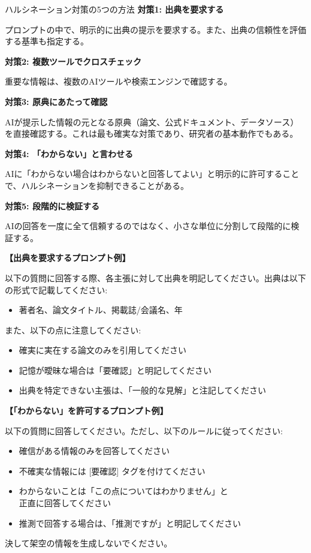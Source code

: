 \begin{itembox}[l]{ハルシネーション対策の5つの方法}
\textbf{対策1: 出典を要求する}

プロンプトの中で、明示的に出典の提示を要求する。また、出典の信頼性を評価する基準も指定する。

\vspace{2mm}
\textbf{対策2: 複数ツールでクロスチェック}

重要な情報は、複数のAIツールや検索エンジンで確認する。

\vspace{2mm}
\textbf{対策3: 原典にあたって確認}

AIが提示した情報の元となる原典（論文、公式ドキュメント、データソース）を直接確認する。これは最も確実な対策であり、研究者の基本動作でもある。

\vspace{2mm}
\textbf{対策4: 「わからない」と言わせる}

AIに「わからない場合はわからないと回答してよい」と明示的に許可することで、ハルシネーションを抑制できることがある。

\vspace{2mm}
\textbf{対策5: 段階的に検証する}

AIの回答を一度に全て信頼するのではなく、小さな単位に分割して段階的に検証する。
\end{itembox}

\begin{promptbox}
\textbf{【出典を要求するプロンプト例】}

以下の質問に回答する際、各主張に対して出典を明記してください。出典は以下の形式で記載してください:
\begin{itemize}
\item 著者名、論文タイトル、掲載誌/会議名、年
\end{itemize}

また、以下の点に注意してください:
\begin{itemize}
\item 確実に実在する論文のみを引用してください
\item 記憶が曖昧な場合は「要確認」と明記してください
\item 出典を特定できない主張は、「一般的な見解」と注記してください
\end{itemize}
\end{promptbox}

\begin{promptbox}
\textbf{【「わからない」を許可するプロンプト例】}

以下の質問に回答してください。ただし、以下のルールに従ってください:
\begin{itemize}
\item 確信がある情報のみを回答してください
\item 不確実な情報には [要確認] タグを付けてください
\item わからないことは「この点についてはわかりません」と\\
正直に回答してください
\item 推測で回答する場合は、「推測ですが」と明記してください
\end{itemize}

決して架空の情報を生成しないでください。
\end{promptbox}

